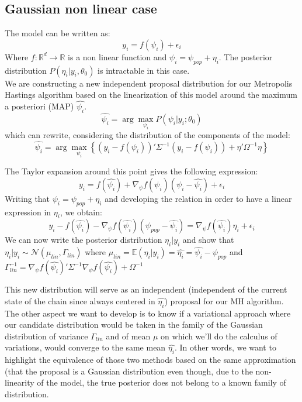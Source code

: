 \documentclass{article}
\begin{document}
\subsection{Gaussian non linear case}
The model can be written as:
\begin{equation}
y_{i} = f(\psi_i) + \epsilon_{i} 
\end{equation}
Where $f:\mathbb{R}^d \to \mathbb{R}$ is a non linear function and $\psi_i = \psi_{pop} + \eta_i$. The posterior distribution $P(\eta_i|y_i,\theta_0)$ is intractable in this case.\\
We are constructing a new independent proposal distribution for our Metropolis Hastings algorithm based on the linearization of this model around the maximum a posteriori (MAP) $\hat{\psi_i}$.
\begin{equation}
\hat{\psi_i} = \arg \max \limits_{\psi_i} P(\psi_i | y_i ; \theta_0)
\end{equation}
which can rewrite, considering the distribution of the components of the model:
\begin{equation}
\hat{\psi_i} = \arg \max \limits_{\psi_i} \left\{ (y_i-f(\psi_i))' \Sigma^{-1} (y_i-f(\psi_i)) + \eta' \Omega^{-1} \eta \right\}
\end{equation}

The Taylor expansion around this point gives the following expression:
\begin{equation}
y_{i} = f(\hat{\psi_i}) + \nabla_{\psi}f(\hat{\psi_i})(\psi_i - \hat{\psi_i}) + \epsilon_{i}
\end{equation}
Writing that $\psi_i = \psi_{pop} + \eta_i$ and developing the relation in order to have a linear expression in $\eta_i$, we obtain:
\begin{equation}
y_{i} - f(\hat{\psi_i}) - \nabla_{\psi}f(\hat{\psi_i})(\psi_{pop} - \hat{\psi_i}) = \nabla_{\psi}f(\hat{\psi_i})\eta_i + \epsilon_{i}
\end{equation}
We can now write the posterior distribution $\eta_i|y_i$ and show that  $\eta_i|y_i \sim \mathcal{N}(\mu_{lin},\Gamma_{lin})$ where
$\mu_{lin} = \mathbb{E}(\eta_i|y_i) = \hat{\eta_i} = \hat{\psi_i} - \psi_{pop}$ and $\Gamma_{lin}^{-1} = \nabla_{\psi}f(\hat{\psi_i})'\Sigma^{-1} \nabla_{\psi}f(\hat{\psi_i}) + \Omega^{-1}$ 

This new distribution will serve as an independent (independent of the current state of the chain since always centered in $\hat{\eta_i}$) proposal for our MH algorithm.\\
The other aspect we want to develop is to know if a variational approach where our candidate distribution would be taken in the family of the Gaussian distribution of variance $\Gamma_{lin}$ and of mean $\mu$ on which we'll do the calculus of variations, would converge to the same mean $\hat{\eta_i}$. In other words, we want to highlight the equivalence of those two methods based on the same approximation (that the proposal is a Gaussian distribution even though, due to the non-linearity of the model, the true posterior does not belong to a known family of distribution.
\end{document}

